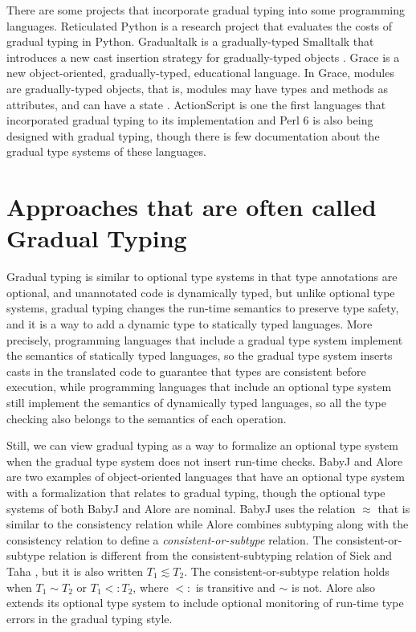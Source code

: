 There are some projects that incorporate gradual typing into some
programming languages.
Reticulated Python \cite{reticulated,vitousek2014deg} is a research
project that evaluates the costs of gradual typing in Python.
Gradualtalk \cite{allende2013gts} is a gradually-typed Smalltalk
that introduces a new cast insertion strategy for gradually-typed
objects \cite{allende2013cis}.
Grace \cite{black2012grace,black2013sg} is a new object-oriented,
gradually-typed, educational language.
In Grace, modules are gradually-typed objects, that is, modules
may have types and methods as attributes, and can have a state
\cite{homer2013modules}.
ActionScript \cite{moock2007as3} is one the first languages that
incorporated gradual typing to its implementation and
Perl 6 \cite{tang2007pri} is also being designed with gradual typing,
though there is few documentation about the gradual type systems
of these languages.

\section{Approaches that are often called Gradual Typing}
\label{sec:approaches}

Gradual typing is similar to optional type systems in that type
annotations are optional, and unannotated code is dynamically
typed, but unlike optional type systems, gradual typing changes
the run-time semantics to preserve type safety, and it is a way to
add a dynamic type to statically typed languages.
More precisely, programming languages that include a gradual type
system implement the semantics of statically typed languages, so
the gradual type system inserts casts in the translated code to
guarantee that types are consistent before execution, while
programming languages that include an optional type system still
implement the semantics of dynamically typed languages, so all
the type checking also belongs to the semantics of each operation.

Still, we can view gradual typing as a way to formalize an optional
type system when the gradual type system does not insert run-time
checks.
BabyJ \cite{anderson2003babyj} and Alore \cite{lehtosalo2011alore}
are two examples of object-oriented languages that have an
optional type system with a formalization that relates to gradual typing,
though the optional type systems of both BabyJ and Alore are nominal.
BabyJ uses the relation $\approx$ that is similar to the consistency
relation while Alore combines subtyping along with the consistency
relation to define a \emph{consistent-or-subtype} relation.
The consistent-or-subtype relation is different from the
consistent-subtyping relation of Siek and Taha \cite{siek2007objects},
but it is also written $T_{1} \lesssim T_{2}$.
The consistent-or-subtype relation holds when $T_{1} \sim T_{2}$
or $T_{1} <: T_{2}$, where $<:$ is transitive and $\sim$ is not.
Alore also extends its optional type system to include optional
monitoring of run-time type errors in the gradual typing style.

